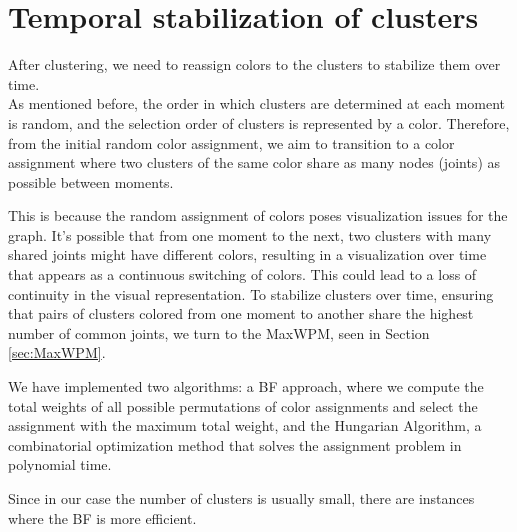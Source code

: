 \chapter{Temporal stabilization of clusters}

After clustering, we need to reassign colors to the clusters to stabilize them over time. \\
As mentioned before, the order in which clusters are determined at each moment is random, and the selection order of clusters is represented by a color.
Therefore, from the initial random color assignment, we aim to transition to a color assignment where two clusters of the same color share as many nodes (joints) as possible between moments.

This is because the random assignment of colors poses visualization issues for the graph.
It's possible that from one moment to the next, two clusters with many shared joints might have different colors, resulting in a visualization over time that appears as a continuous switching of colors. This could lead to a loss of continuity in the visual representation.
To stabilize clusters over time, ensuring that pairs of clusters colored from one moment to another share the highest number of common joints, we turn to the MaxWPM, seen in Section \ref{sec:MaxWPM}.

We have implemented two algorithms: a BF approach, where we compute the total weights of all possible permutations of color assignments and select the assignment with the maximum total weight, and the Hungarian Algorithm, a combinatorial optimization method that solves the assignment problem in polynomial time.

Since in our case the number of clusters is usually small, there are instances where the BF is more efficient.

